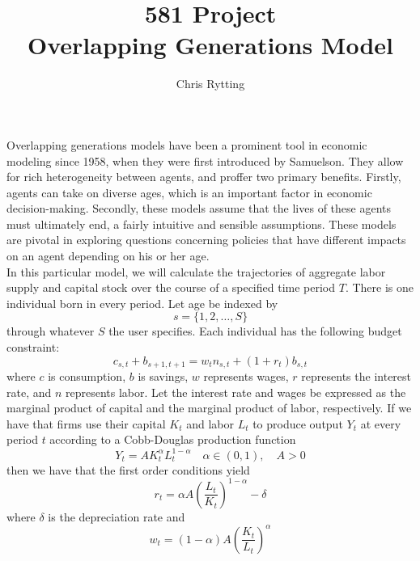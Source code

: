 \documentclass[letterpaper,12pt]{article}
\theoremstyle{definition}
\begin{document}
\title{581 Project\\Overlapping Generations Model}
\author{Chris Rytting}
\maketitle
	Overlapping generations models have been a prominent tool in economic modeling since 1958, when they were first introduced by Samuelson. They allow for rich heterogeneity between agents, and proffer two primary benefits. Firstly, agents can take on diverse ages, which is an important factor in economic decision-making. Secondly, these models assume that the lives of these agents must ultimately end, a fairly intuitive and sensible assumptions. These models are pivotal in exploring questions concerning policies that have different impacts on an agent depending on his or her age. \\
\indent	In this particular model, we will calculate the trajectories of aggregate labor supply and capital stock over the course of a specified time period $T$. There is one individual born in every period. Let age be indexed by \[s  = \{1,2,\dots,S\}\] through whatever $S$ the user specifies. Each individual has the following budget constraint:
    \[c_{s,t} + b_{s+1,t+1} = w_t n_{s,t} + (1 + r_t)b_{s,t}\]
where $c$ is consumption, $b$ is savings, $w$ represents wages, $r$ represents the interest rate, and $n$ represents labor. Let the interest rate and wages be expressed as the marginal product of capital and the marginal product of labor, respectively. If we have that firms use their capital $K_t$ and labor $L_t$ to produce output $Y_t$ at every period $t$ according to a Cobb-Douglas production function
\[ Y_t = AK_t^\alpha L_t^{1-\alpha} \quad \alpha \in (0,1), \quad A > 0\]
then we have that the first order conditions yield
\[r_t = \alpha A \left( \frac{L_t}{K_t} \right)^{1-\alpha} - \delta\]
where $\delta$ is the depreciation rate and
\[w_t = (1-\alpha) A \left( \frac{K_t}{L_t} \right)^{\alpha} \]
\end{document}
